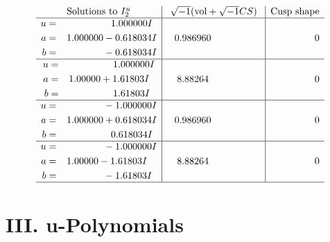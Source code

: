 \documentclass[1p]{elsarticle_modified}
\theoremstyle{definition}
\newcommand{\I}{\sqrt{-1}}
\begin{document}
$$\begin{array}{c|c|c}  
\text{Solutions to }I^u_{2}& \I (\text{vol} + \sqrt{-1}CS) & \text{Cusp shape}\\
 \hline 
\begin{aligned}
u &= \phantom{-0.000000 -}1.000000 I \\
a &= \phantom{-}1.000000 - 0.618034 I \\
b &= \phantom{-0.000000 } -0.618034 I\end{aligned}
 & \phantom{-}0.986960\phantom{ +0.000000I} & \phantom{-0.000000 } 0 \\ \hline\begin{aligned}
u &= \phantom{-0.000000 -}1.000000 I \\
a &= \phantom{-}1.00000 + 1.61803 I \\
b &= \phantom{-0.000000 -}1.61803 I\end{aligned}
 & \phantom{-}8.88264\phantom{ +0.000000I} & \phantom{-0.000000 } 0 \\ \hline\begin{aligned}
u &= \phantom{-0.000000 } -1.000000 I \\
a &= \phantom{-}1.000000 + 0.618034 I \\
b &= \phantom{-0.000000 -}0.618034 I\end{aligned}
 & \phantom{-}0.986960\phantom{ +0.000000I} & \phantom{-0.000000 } 0 \\ \hline\begin{aligned}
u &= \phantom{-0.000000 } -1.000000 I \\
a &= \phantom{-}1.00000 - 1.61803 I \\
b &= \phantom{-0.000000 } -1.61803 I\end{aligned}
 & \phantom{-}8.88264\phantom{ +0.000000I} & \phantom{-0.000000 } 0\\
 \hline 
 \end{array}$$\newpage
\newpage\renewcommand{\arraystretch}{1}
\centering \section*{ III. u-Polynomials}
\end{document}
